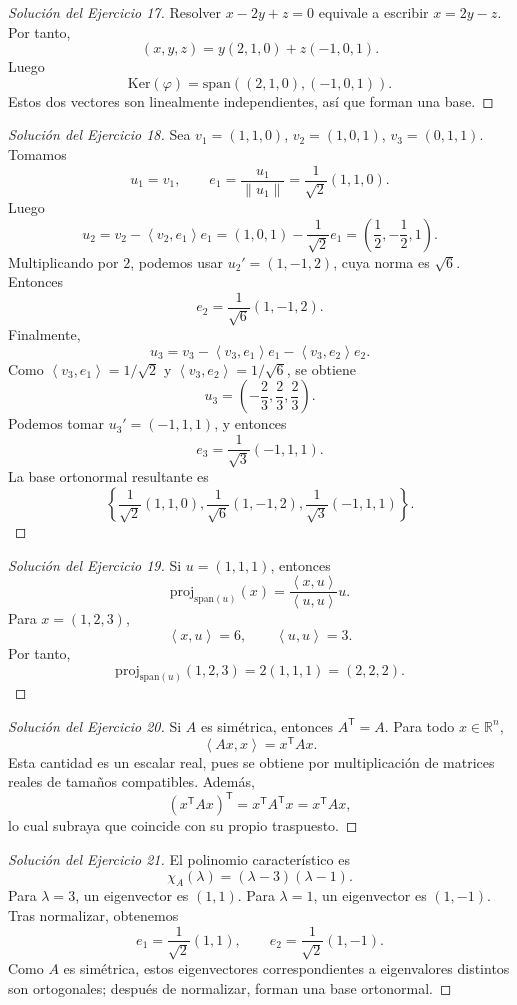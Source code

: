 \documentclass[10pt,a4paper,oneside]{article}
\theoremstyle{plain}
\theoremstyle{definition}
\theoremstyle{remark}
\newcommand{\R}{\mathbb{R}}
\newcommand{\Ker}{\mathrm{Ker}}
\newcommand{\Span}{\mathrm{span}}
\newcommand{\transpose}{^{\mathsf{T}}}
\newcommand{\angles}[1]{\left\langle #1 \right\rangle}
\begin{document}
\begin{proof}[Solución del Ejercicio 17]
Resolver \(x-2y+z=0\) equivale a escribir \(x=2y-z\). Por tanto,
\[(x,y,z)=y(2,1,0)+z(-1,0,1).
\]
Luego
\[\Ker(\varphi)=\Span((2,1,0),(-1,0,1)).
\]
Estos dos vectores son linealmente independientes, así que forman una base.
\end{proof}
\begin{proof}[Solución del Ejercicio 18]
Sea \(v_1=(1,1,0)\), \(v_2=(1,0,1)\), \(v_3=(0,1,1)\). Tomamos
\[u_1=v_1,
\qquad e_1=\frac{u_1}{\|u_1\|}=\frac1{\sqrt2}(1,1,0).
\]
Luego
\[u_2=v_2-\angles{v_2,e_1}e_1=(1,0,1)-\frac1{\sqrt2}e_1=\left(\frac12,-\frac12,1\right).
\]
Multiplicando por \(2\), podemos usar \(u_2'=(1,-1,2)\), cuya norma es \(\sqrt6\). Entonces
\[e_2=\frac1{\sqrt6}(1,-1,2).
\]
Finalmente,
\[u_3=v_3-\angles{v_3,e_1}e_1-\angles{v_3,e_2}e_2.
\]
Como \(\angles{v_3,e_1}=1/\sqrt2\) y \(\angles{v_3,e_2}=1/\sqrt6\), se obtiene
\[u_3=\left(-\frac23,\frac23,\frac23\right).
\]
Podemos tomar \(u_3'=(-1,1,1)\), y entonces
\[e_3=\frac1{\sqrt3}(-1,1,1).
\]
La base ortonormal resultante es
\[\left\{\frac1{\sqrt2}(1,1,0),\frac1{\sqrt6}(1,-1,2),\frac1{\sqrt3}(-1,1,1)\right\}.
\]
\end{proof}
\begin{proof}[Solución del Ejercicio 19]
Si \(u=(1,1,1)\), entonces
\[\mathrm{proj}_{\Span(u)}(x)=\frac{\angles{x,u}}{\angles{u,u}}u.
\]
Para \(x=(1,2,3)\),
\[\angles{x,u}=6,
\qquad
\angles{u,u}=3.
\]
Por tanto,
\[\mathrm{proj}_{\Span(u)}(1,2,3)=2(1,1,1)=(2,2,2).
\]
\end{proof}
\begin{proof}[Solución del Ejercicio 20]
Si \(A\) es simétrica, entonces \(A\transpose=A\). Para todo \(x\in\R^n\),
\[\angles{Ax,x}=x\transpose Ax.
\]
Esta cantidad es un escalar real, pues se obtiene por multiplicación de matrices reales de tamaños compatibles. Además,
\[(x\transpose Ax)\transpose=x\transpose A\transpose x=x\transpose Ax,
\]
lo cual subraya que coincide con su propio traspuesto.
\end{proof}
\begin{proof}[Solución del Ejercicio 21]
El polinomio característico es
\[\chi_A(\lambda)=(\lambda-3)(\lambda-1).
\]
Para \(\lambda=3\), un eigenvector es \((1,1)\). Para \(\lambda=1\), un eigenvector es \((1,-1)\). Tras normalizar, obtenemos
\[e_1=\frac1{\sqrt2}(1,1),\qquad e_2=\frac1{\sqrt2}(1,-1).
\]
Como \(A\) es simétrica, estos eigenvectores correspondientes a eigenvalores distintos son ortogonales; después de normalizar, forman una base ortonormal.
\end{proof}
\end{document}
